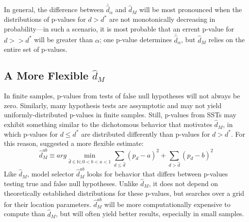\documentclass[12pt]{article}\usepackage[]{graphicx}\usepackage[]{color}
\newcommand{\dalphaU}{\bar{\hat{d}}_\alpha}
\newcommand{\dstar}{d^*}
\newcommand{\dhat}{\hat{d}}
\newcommand{\dhatm}{\hat{d}_M}
\newcommand{\dhatmab}{\hat{d}^{ab}_M}
\begin{document}
In general, the difference between $\dalphaU$ and $\dhatm$ will be
most pronounced when the distributions of p-values for $d>\dstar$ are
not monotonically decreasing in probability---in such a scenario, it
is most probable that an errent p-value for $d>>\dstar$ will be
greater than $\alpha$; one p-value determines $\dalphaU$, but
$\dhatm$ relies on the entire set of p-values.

\subsection{A More Flexible $\dhatm$}
In finite samples, p-values from tests of false null hypotheses will
not always be zero.
Similarly, many hypothesis tests are assymptotic and may not yield
uniformly-distributed p-values in finite samples.
Still, p-values from SSTs may exhibit something similar to the
dichotomous behavior that motivates $\dhatm$, in which p-values for
$d\le \dstar$ are distributed differently than p-values for
$d>\dstar$.
For this reason, \citet{mallik} suggested a more flexible estimate:
\begin{equation}
  \dhatmab \equiv arg\displaystyle\min_{\dhat\in \mathbb{N}; 0<b<a<1}
  \displaystyle\sum_{d\le \dhat} ( p_d
  -a)^2+\displaystyle\sum_{d>\dhat} (p_d-b)^2
\end{equation}
Like $\dhatm$, model selector $\dhatmab$ looks for behavior that
differs between p-values testing true and false null hypotheses.
Unlike $\dhatm$, it does not depend on theoretically established
distributions for these p-values, but searches over a grid for their
location parameters.
$\dhatmab$ will be more computationally expensive to compute than
$\dhatm$, but will often yield better results, especially in small
samples.
\end{document}
